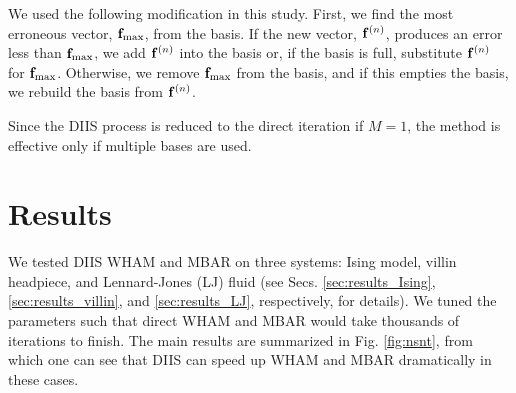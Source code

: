 \documentclass[reprint,aip,jcp,superscriptaddress]{revtex4-1}
\begin{document}
We used the following modification
in this study.
%
%
%
%
First, we find the most erroneous vector,
$\mathbf{f}_\mathrm{max}$, from the basis.
%
If the new vector, $\mathbf{f}^{(n)}$,
produces an error less than $\mathbf{f}_\mathrm{max}$,
we add $\mathbf{f}^{(n)}$ into the basis
or, if the basis is full,
substitute $\mathbf{f}^{(n)}$ for $\mathbf{f}_\mathrm{max}$.
%
Otherwise,
we remove $\mathbf{f}_\mathrm{max}$ from the basis,
and if this empties the basis,
we rebuild the basis from $\mathbf{f}^{(n)}$.



Since the DIIS process is reduced
to the direct iteration
if $M = 1$,
the method is effective
only if multiple bases are used.





\section{Results}





We tested DIIS WHAM and MBAR on three systems:
Ising model,
villin headpiece,
and
Lennard-Jones (LJ) fluid
(see Secs.
\ref{sec:results_Ising},
\ref{sec:results_villin},
and
\ref{sec:results_LJ},
respectively,
for details).
%
We tuned the parameters
such that direct WHAM and MBAR
would take thousands of iterations
to finish.
%
The main results
are summarized
in Fig. \ref{fig:nsnt},
from which one can see that
DIIS can speed up WHAM and MBAR
dramatically in these cases.
\end{document}
